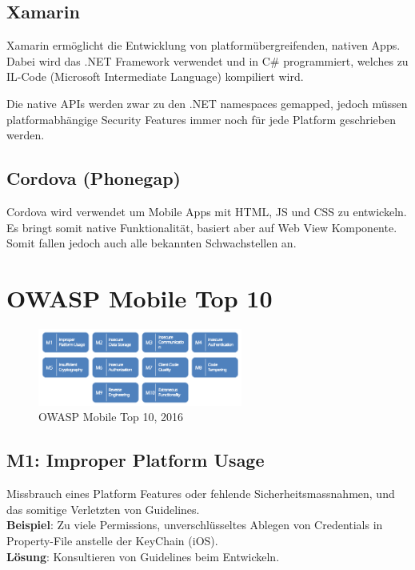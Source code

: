 \subsection{Xamarin}
Xamarin ermöglicht die Entwicklung von platformübergreifenden, nativen Apps. Dabei wird das .NET Framework verwendet und in C\# programmiert, welches zu IL-Code (Microsoft Intermediate Language) kompiliert wird.

Die native APIs werden zwar zu den .NET namespaces gemapped, jedoch müssen platformabhängige Security Features immer noch für jede Platform geschrieben werden.

\subsection{Cordova (Phonegap)}
Cordova wird verwendet um Mobile Apps mit HTML, JS und CSS zu entwickeln. Es bringt somit native Funktionalität, basiert aber auf Web View Komponente. Somit fallen jedoch auch alle bekannten Schwachstellen an.

\section{OWASP Mobile Top 10}
\begin{figure}[H]
	\centering
	\includegraphics[width=0.6\textwidth]{./img/OWASP_MobileTop10}
	\caption{OWASP Mobile Top 10, 2016}
\end{figure}

\subsection{M1: Improper Platform Usage}
Missbrauch eines Platform Features oder fehlende Sicherheitsmassnahmen, und das somitige Verletzten von Guidelines. \\

\textbf{Beispiel}: Zu viele Permissions, unverschlüsseltes Ablegen von Credentials in Property-File anstelle der KeyChain (iOS). \\

\textbf{Lösung}: Konsultieren von Guidelines beim Entwickeln.

